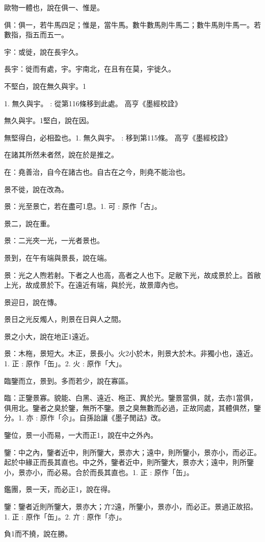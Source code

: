 \begin{pinyinscope}
歐物一體也，說在俱一、惟是。

俱：俱一，若牛馬四足；惟是，當牛馬。數牛數馬則牛馬二；數牛馬則牛馬一。若數指，指五而五一。

宇：或徙，說在長宇久。

長宇：徙而有處，宇。宇南北，在且有在莫，宇徙久。

不堅白，說在無久與宇。1

1. 無久與宇。 : 從第116條移到此處。  高亨《墨經校詮》

無久與宇。1堅白，說在因。

無堅得白，必相盈也。1. 無久與宇。 : 移到第115條。  高亨《墨經校詮》

在諸其所然未者然，說在於是推之。

在：堯善治，自今在諸古也。自古在之今，則堯不能治也。

景不徙，說在改為。

景：光至景亡，若在盡可1息。1. 可 : 原作「古」。

景二，說在重。

景：二光夾一光，一光者景也。

景到，在午有端與景長，說在端。

景：光之人煦若射。下者之人也高，高者之人也下。足敝下光，故成景於上。首敝上光，故成景於下。在遠近有端，與於光，故景㢓內也。

景迎日，說在慱。

景日之光反燭人，則景在日與人之間。

景之小大，說在地正1遠近。

景：木柂，景短大。木正，景長小。火2小於木，則景大於木。非獨小也，遠近。1. 正 : 原作「缶」。2. 火 : 原作「大」。

臨鑒而立，景到。多而若少，說在寡區。

臨：正鑒景寡。貌能、白黑、遠近、柂正、異於光。鑒景當俱，就，去亦1當俱，俱用北。鑒者之臭於鑒，無所不鑒。景之臭無數而必過，正故同處，其體俱然，鑒分。1. 亦 : 原作「尒」。自孫詒讓《墨子閒詁》改。

鑒位，景一小而易，一大而正1，說在中之外內。

鑒：中之內，鑒者近中，則所鑒大，景亦大；遠中，則所鑒小，景亦小，而必正。起於中緣正而長其直也。中之外，鑒者近中，則所鑒大，景亦大；遠中，則所鑒小，景亦小，而必易。合於而長其直也。1. 正 : 原作「缶」。

鑑團，景一天，而必正1，說在得。

鑒：鑒者近則所鑒大，景亦大；亣2遠，所鑒小，景亦小，而必正。景過正故招。1. 正 : 原作「缶」。2. 亣 : 原作「亦」。

負1而不撓，說在勝。


\end{pinyinscope}
